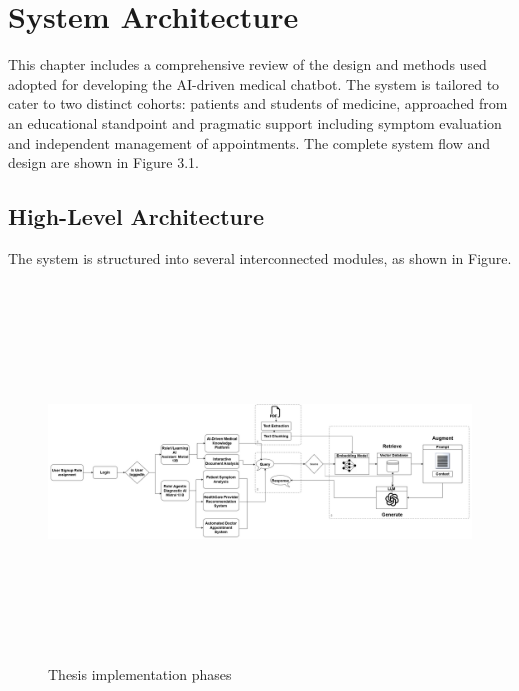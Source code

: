 \chapter{System Architecture}
\label{chap:design_methodology}

This chapter includes a comprehensive review of the design and methods used adopted for developing the AI-driven medical chatbot. The system is tailored to cater to two distinct cohorts: patients and students of medicine, approached from an educational standpoint and pragmatic support including symptom evaluation and independent management of appointments. The complete system flow and design are shown in Figure 3.1.

\section{High-Level Architecture}
\label{sec:high_level_architecture}

The system is structured into several interconnected modules, as shown in Figure.
\begin{figure}[htbp]
    \begin{center}
      \includegraphics[width=16cm,height=10cm]{./Images/Thesis.png}
       \caption{Thesis implementation phases}
       \label{fig: Thesis implementation phases}
    \end{center}
\end{figure}

